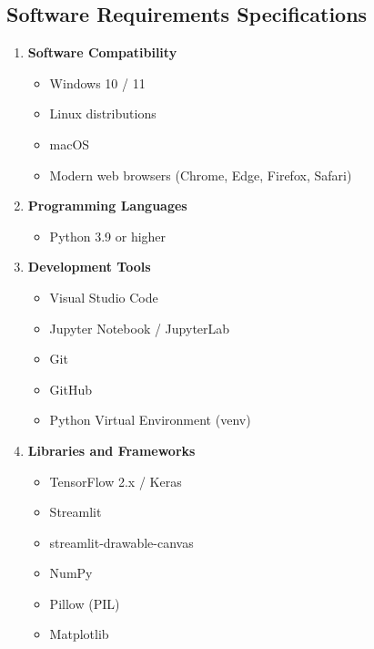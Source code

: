 \documentclass[12pt,a4paper]{report}
\begin{document}
\subsection{Software Requirements Specifications}
\begin{enumerate}
    \item \textbf{Software Compatibility}
    \begin{itemize}
        \item Windows 10 / 11
        \item Linux distributions
        \item macOS
        \item Modern web browsers (Chrome, Edge, Firefox, Safari)
    \end{itemize}
    \item \textbf{Programming Languages}
    \begin{itemize}
        \item Python 3.9 or higher
    \end{itemize}
    \item \textbf{Development Tools}
    \begin{itemize}
        \item Visual Studio Code
        \item Jupyter Notebook / JupyterLab
        \item Git
        \item GitHub
        \item Python Virtual Environment (venv)
    \end{itemize}
    \item \textbf{Libraries and Frameworks}
    \begin{itemize}
        \item TensorFlow 2.x / Keras
        \item Streamlit
        \item streamlit-drawable-canvas
        \item NumPy
        \item Pillow (PIL)
        \item Matplotlib
    \end{itemize}
\end{enumerate}
\end{document}
